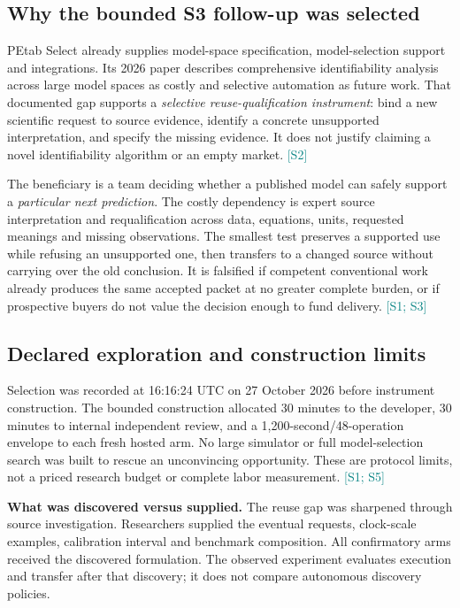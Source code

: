 \documentclass[10pt,letterpaper]{article}
\newcommand{\src}[1]{\textcolor{Teal}{\scriptsize[#1]}}
\begin{document}
\subsection*{Why the bounded S3 follow-up was selected}
PEtab Select already supplies model-space specification, model-selection support and integrations. Its 2026 paper describes comprehensive identifiability analysis across large model spaces as costly and selective automation as future work. That documented gap supports a \emph{selective reuse-qualification instrument}: bind a new scientific request to source evidence, identify a concrete unsupported interpretation, and specify the missing evidence. It does not justify claiming a novel identifiability algorithm or an empty market. \src{S2}

The beneficiary is a team deciding whether a published model can safely support a \emph{particular next prediction}. The costly dependency is expert source interpretation and requalification across data, equations, units, requested meanings and missing observations. The smallest test preserves a supported use while refusing an unsupported one, then transfers to a changed source without carrying over the old conclusion. It is falsified if competent conventional work already produces the same accepted packet at no greater complete burden, or if prospective buyers do not value the decision enough to fund delivery. \src{S1; S3}

\subsection*{Declared exploration and construction limits}
Selection was recorded at 16:16:24 UTC on 27 October 2026 before instrument construction. The bounded construction allocated 30 minutes to the developer, 30 minutes to internal independent review, and a 1,200-second/48-operation envelope to each fresh hosted arm. No large simulator or full model-selection search was built to rescue an unconvincing opportunity. These are protocol limits, not a priced research budget or complete labor measurement. \src{S1; S5}

\textbf{What was discovered versus supplied.} The reuse gap was sharpened through source investigation. Researchers supplied the eventual requests, clock-scale examples, calibration interval and benchmark composition. All confirmatory arms received the discovered formulation. The observed experiment evaluates execution and transfer after that discovery; it does not compare autonomous discovery policies.
\end{document}
